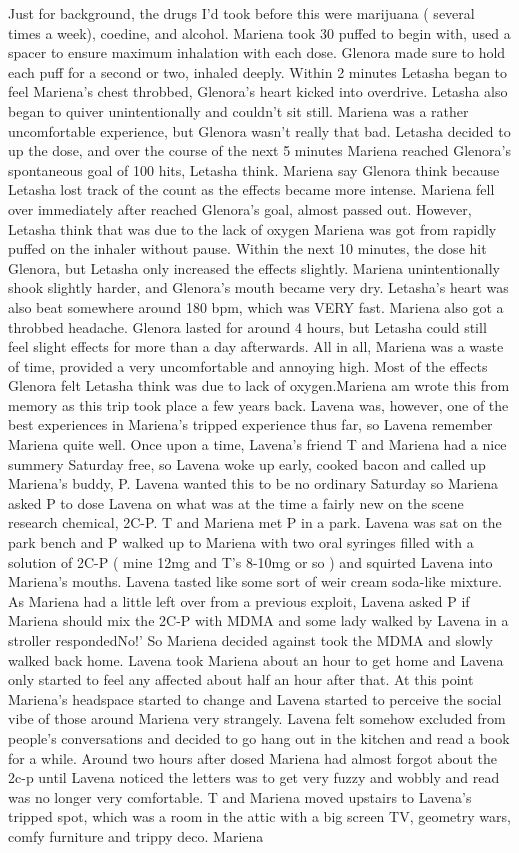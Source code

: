 \documentclass[12pt]{book}
\begin{document}
Just for background, the drugs I'd took before this were marijuana ( several times a week), coedine, and alcohol. Mariena took 30 puffed to begin with, used a spacer to ensure maximum inhalation with each dose. Glenora made sure to hold each puff for a second or two, inhaled deeply. Within 2 minutes Letasha began to feel Mariena's chest throbbed, Glenora's heart kicked into overdrive. Letasha also began to quiver unintentionally and couldn't sit still. Mariena was a rather uncomfortable experience, but Glenora wasn't really that bad. Letasha decided to up the dose, and over the course of the next 5 minutes Mariena reached Glenora's spontaneous goal of 100 hits, Letasha think. Mariena say Glenora think because Letasha lost track of the count as the effects became more intense. Mariena fell over immediately after reached Glenora's goal, almost passed out. However, Letasha think that was due to the lack of oxygen Mariena was got from rapidly puffed on the inhaler without pause. Within the next 10 minutes, the dose hit Glenora, but Letasha only increased the effects slightly. Mariena unintentionally shook slightly harder, and Glenora's mouth became very dry. Letasha's heart was also beat somewhere around 180 bpm, which was VERY fast. Mariena also got a throbbed headache. Glenora lasted for around 4 hours, but Letasha could still feel slight effects for more than a day afterwards. All in all, Mariena was a waste of time, provided a very uncomfortable and annoying high. Most of the effects Glenora felt Letasha think was due to lack of oxygen.Mariena am wrote this from memory as this trip took place a few years back. Lavena was, however, one of the best experiences in Mariena's tripped experience thus far, so Lavena remember Mariena quite well. Once upon a time, Lavena's friend T and Mariena had a nice summery Saturday free, so Lavena woke up early, cooked bacon and called up Mariena's buddy, P. Lavena wanted this to be no ordinary Saturday so Mariena asked P to dose Lavena on what was at the time a fairly new on the scene research chemical, 2C-P. T and Mariena met P in a park. Lavena was sat on the park bench and P walked up to Mariena with two oral syringes filled with a solution of 2C-P ( mine 12mg and T's 8-10mg or so ) and squirted Lavena into Mariena's mouths. Lavena tasted like some sort of weir cream soda-like mixture. As Mariena had a little left over from a previous exploit, Lavena asked P if Mariena should mix the 2C-P with MDMA and some lady walked by Lavena in a stroller respondedNo!' So Mariena decided against took the MDMA and slowly walked back home. Lavena took Mariena about an hour to get home and Lavena only started to feel any affected about half an hour after that. At this point Mariena's headspace started to change and Lavena started to perceive the social vibe of those around Mariena very strangely. Lavena felt somehow excluded from people's conversations and decided to go hang out in the kitchen and read a book for a while. Around two hours after dosed Mariena had almost forgot about the 2c-p until Lavena noticed the letters was to get very fuzzy and wobbly and read was no longer very comfortable. T and Mariena moved upstairs to Lavena's tripped spot, which was a room in the attic with a big screen TV, geometry wars, comfy furniture and trippy deco. Mariena 
\end{document}
